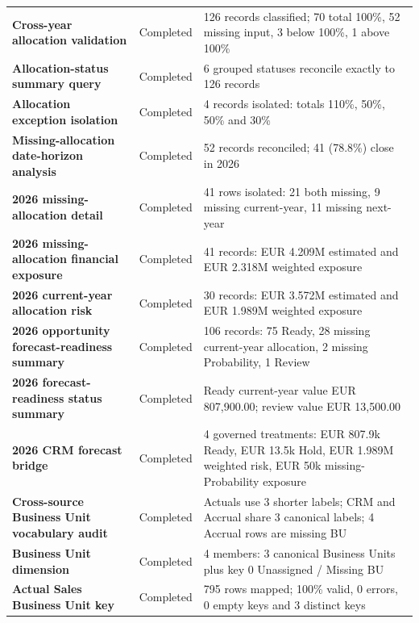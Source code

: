 \documentclass[11pt,a4paper]{article}
\begin{document}
\begin{tabularx}{\textwidth}{
    >{\bfseries}p{5.8cm}
    p{2.8cm}
    X
}
Cross-year allocation validation
&
Completed
&
126 records classified; 70 total 100\%, 52 missing input, 3 below 100\%, 1 above 100\%
\\

Allocation-status summary query
&
Completed
&
6 grouped statuses reconcile exactly to 126 records
\\

Allocation exception isolation
&
Completed
&
4 records isolated: totals 110\%, 50\%, 50\% and 30\%
\\

Missing-allocation date-horizon analysis
&
Completed
&
52 records reconciled; 41 (78.8\%) close in 2026
\\

2026 missing-allocation detail
&
Completed
&
41 rows isolated: 21 both missing, 9 missing current-year, 11 missing next-year
\\

2026 missing-allocation financial exposure
&
Completed
&
41 records: EUR 4.209M estimated and EUR 2.318M weighted exposure
\\

2026 current-year allocation risk
&
Completed
&
30 records: EUR 3.572M estimated and EUR 1.989M weighted exposure
\\

2026 opportunity forecast-readiness summary
&
Completed
&
106 records: 75 Ready, 28 missing current-year allocation, 2 missing Probability, 1 Review
\\

2026 forecast-readiness status summary
&
Completed
&
Ready current-year value EUR 807,900.00; review value EUR 13,500.00
\\

2026 CRM forecast bridge
&
Completed
&
4 governed treatments: EUR 807.9k Ready, EUR 13.5k Hold, EUR 1.989M weighted risk, EUR 50k missing-Probability exposure
\\

Cross-source Business Unit vocabulary audit
&
Completed
&
Actuals use 3 shorter labels; CRM and Accrual share 3 canonical labels; 4 Accrual rows are missing BU
\\

Business Unit dimension
&
Completed
&
4 members: 3 canonical Business Units plus key 0 Unassigned / Missing BU
\\

Actual Sales Business Unit key
&
Completed
&
795 rows mapped; 100\% valid, 0 errors, 0 empty keys and 3 distinct keys
\\


\end{tabularx}
\end{document}
